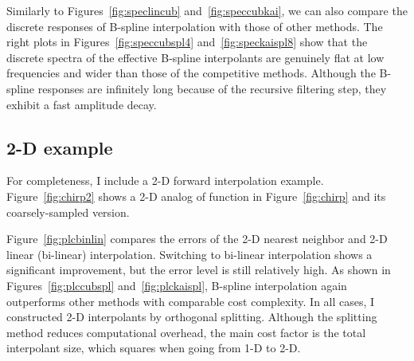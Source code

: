 
\par
Similarly to Figures~\ref{fig:speclincub} and~\ref{fig:speccubkai}, we
can also compare the discrete responses of B-spline interpolation with
those of other methods. The right plots in
Figures~\ref{fig:speccubspl4} and~\ref{fig:speckaispl8} show that the
discrete spectra of the effective B-spline interpolants are genuinely
flat at low frequencies and wider than those of the competitive
methods. Although the B-spline responses are infinitely long because
of the recursive filtering step, they exhibit a fast amplitude decay.



\subsection{2-D example}

For completeness, I include a 2-D forward interpolation example.
Figure~\ref{fig:chirp2} shows a 2-D analog of function in
Figure~\ref{fig:chirp} and its coarsely-sampled version.

\par
Figure~\ref{fig:plcbinlin} compares the errors of the 2-D nearest
neighbor and 2-D linear (bi-linear) interpolation. Switching to
bi-linear interpolation shows a significant improvement, but the error
level is still relatively high. As shown in
Figures~\ref{fig:plccubspl} and~\ref{fig:plckaispl}, B-spline
interpolation again outperforms other methods with comparable
cost complexity. In all cases, I constructed 2-D interpolants by orthogonal
splitting. Although the splitting method reduces computational
overhead, the main cost factor is the total interpolant size, which
squares when going from 1-D to 2-D.

